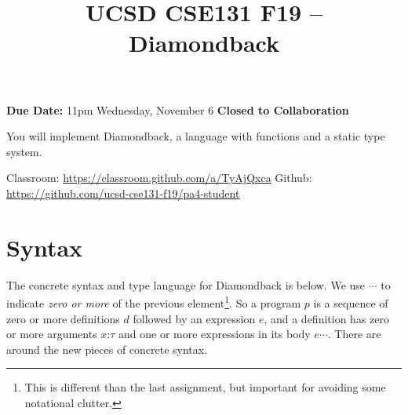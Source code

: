 \documentclass[10pt, oneside]{article}
\title{UCSD CSE131 F19 -- Diamondback}
\begin{document}
\maketitle 

{\bf Due Date:} 11pm Wednesday, November 6 \hspace{2em} {\bf Closed to Collaboration}

You will implement Diamondback, a language with functions and a static type
system.

Classroom: \url{https://classroom.github.com/a/TyAjQxca} \hspace{1em} Github: \url{https://github.com/ucsd-cse131-f19/pa4-student}


\section*{Syntax}

The concrete syntax and type language for Diamondback is below. We use
$\cdots$ to indicate \textit{zero or more} of the previous
element\footnote{This is different than the last assignment, but important
for avoiding some notational clutter.}. So a program $p$ is a sequence of zero
or more definitions $d$ followed by an expression $e$, and a definition has
zero or more arguments $x \texttt{:}\tau$ and one or more expressions in its
body $e \cdots$. There are  around the new pieces of concrete
syntax.
\end{document}
